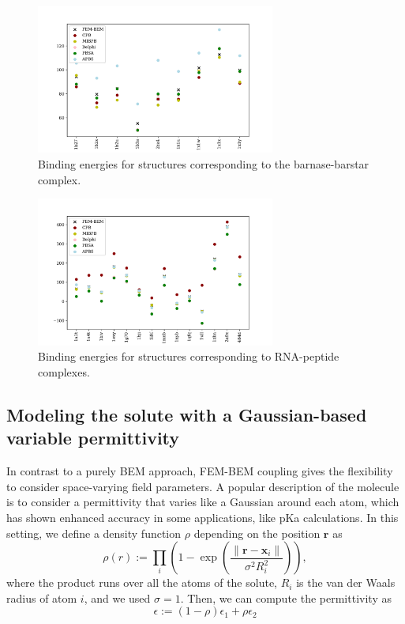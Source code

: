 \begin{figure}
\centering
\includegraphics[width=0.7\textwidth]{binding_energy_barnase-barstar.pdf}
\caption{Binding energies for structures corresponding to the barnase-barstar complex.}
\label{fig:barnase_barstar}
\end{figure}

\begin{figure}
\centering
\includegraphics[width=0.7\textwidth]{binding_energy_rna-peptide.pdf}
\caption{Binding energies for structures corresponding to RNA-peptide complexes.}
\label{fig:rna_peptide}
\end{figure}


\subsection*{\sffamily \large Modeling the solute with a Gaussian-based variable permittivity}

In contrast to a purely BEM approach, FEM-BEM coupling gives the flexibility to consider space-varying field parameters. 
A popular description of the molecule is to consider a permittivity that varies like a Gaussian around each atom,\cite{grant2001smooth} which has shown enhanced accuracy in some applications, like pKa calculations.\cite{li2013dielectric}
In this setting, we define a density function $\rho$ depending on the position $\mathbf{r}$ as
%
\begin{equation}
\rho(r) := \prod_i \left(1 - \exp{\left(\frac{\|\mathbf{r}-\mathbf{x}_i\|}{\sigma^2 R_i^2}\right)}\right),
\end{equation}
%
where the product runs over all the atoms of the solute, $R_i$ is the van der Waals radius of atom $i$, and we used $\sigma=1$. Then, we can compute the permittivity as
%
\begin{equation}\label{eq:varying_eps}
\epsilon := \left(1-\rho \right) \epsilon_1 + \rho\epsilon_2
\end{equation}

